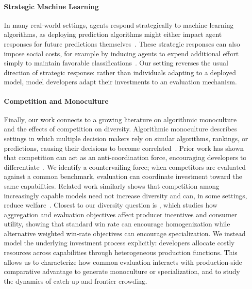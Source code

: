 \paragraph{Strategic Machine Learning}
In many real-world settings, agents respond strategically to machine learning algorithms, as deploying prediction algorithms might either impact agent responses for future predictions themselves~\citep{strategic_classification,strategic_investment,performative_prediction,strategic_ranking}.
These strategic responses can also impose social costs, for example by inducing agents to expend additional effort simply to maintain favorable classifications~\citep{social_cost_strategic_classification}.
Our setting reverses the usual direction of strategic response: rather than individuals adapting to a deployed model, model developers adapt their investments to an evaluation mechanism.

\paragraph{Competition and Monoculture}
Finally, our work connects to a growing literature on algorithmic monoculture and the effects of competition on diversity.
Algorithmic monoculture describes settings in which multiple decision makers rely on similar algorithms, rankings, or predictions, causing their decisions to become correlated~\citep{correlated_errors,subjectivity_monoculture,monoculture_outcome}.
Prior work has shown that competition can act as an anti-coordination force, encouraging developers to differentiate~\citep{competition_diversity}.
We identify a countervailing force; when competitors are evaluated against a common benchmark, evaluation can coordinate investment toward the same capabilities.
Related work similarly shows that competition among increasingly capable models need not increase diversity and can, in some settings, reduce welfare~\citep{bayes_risk_welfare}.
Closest to our diversity question is \citet{aggregation_diversity}, which studies how aggregation and evaluation objectives affect producer incentives and consumer utility, showing that standard win rate can encourage homogenization while alternative weighted win-rate objectives can encourage specialization. 
We instead model the underlying investment process explicitly: developers allocate costly resources across capabilities through heterogeneous production functions. 
This allows us to characterize how common evaluation interacts with production-side comparative advantage to generate monoculture or specialization, and to study the dynamics of catch-up and frontier crowding.